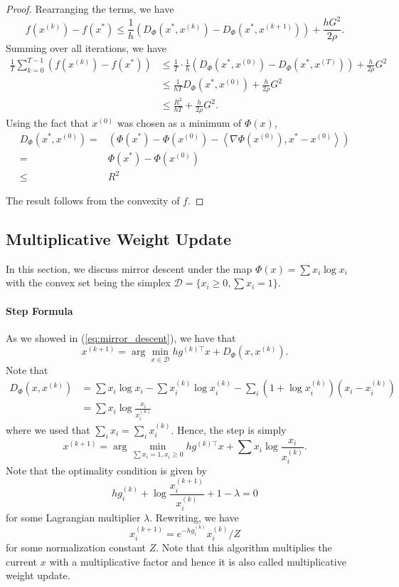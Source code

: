 \begin{proof}
Rearranging the terms, we have
\[
f(x^{(k)})-f(x^{*})\leq\frac{1}{h}\left(D_{\Phi}(x^{*},x^{(k)})-D_{\Phi}(x^{*},x^{(k+1)})\right)+\frac{hG^{2}}{2\rho}.
\]
Summing over all iterations, we have
\begin{align*}
\frac{1}{T}\sum_{k=0}^{T-1}(f(x^{(k)})-f(x^{*})) & \leq\frac{1}{T}\cdot\frac{1}{h}(D_{\Phi}(x^{*},x^{(0)})-D_{\Phi}(x^{*},x^{(T)}))+\frac{h}{2\rho}G^{2}\\
 & \leq\frac{1}{hT}D_{\Phi}(x^{*},x^{(0)})+\frac{h}{2\rho}G^{2}\\
 & \leq\frac{R^{2}}{hT}+\frac{h}{2\rho}G^{2}.
\end{align*}
Using the fact that $x^{(0)}$ was chosen as a minimum of $\Phi(x)$,
\begin{align*}
D_{\Phi}(x^{*},x^{(0)})= & (\Phi(x^{*})-\Phi(x^{(0)})-\left\langle \nabla\Phi(x^{(0)}),x^{*}-x^{(0)}\right\rangle )\\
= & \Phi(x^{*})-\Phi(x^{(0)})\\
\le & R^{2}
\end{align*}

The result follows from the convexity of $f$.
\end{proof}

\subsection{Multiplicative Weight Update}

In this section, we discuss mirror descent under the map $\Phi(x)=\sum x_{i}\log x_{i}$
with the convex set being the simplex $\mathcal{D}=\{x_{i}\geq0,\sum x_{i}=1\}$.

\paragraph{Step Formula}

As we showed in (\ref{eq:mirror_descent}), we have that
\[
x^{(k+1)}=\arg\min_{x\in\mathcal{D}}hg^{(k)\top}x+D_{\Phi}(x,x^{(k)}).
\]
Note that
\begin{align*}
D_{\Phi}(x,x^{(k)}) & =\sum x_{i}\log x_{i}-\sum x_{i}^{(k)}\log x_{i}^{(k)}-\sum_{i}(1+\log x_{i}^{(k)})(x_{i}-x_{i}^{(k)})\\
 & =\sum x_{i}\log\frac{x_{i}}{x_{i}^{(k)}}
\end{align*}
where we used that $\sum_{i}x_{i}=\sum_{i}x_{i}^{(k)}$. Hence, the
step is simply 
\[
x^{(k+1)}=\arg\min_{\sum x_{i}=1,x_{i}\geq0}hg^{(k)\top}x+\sum x_{i}\log\frac{x_{i}}{x_{i}^{(k)}}.
\]
Note that the optimality condition is given by
\[
hg_{i}^{(k)}+\log\frac{x_{i}^{(k+1)}}{x_{i}^{(k)}}+1-\lambda=0
\]
for some Lagrangian multiplier $\lambda$. Rewriting, we have
\[
x_{i}^{(k+1)}=e^{-hg_{i}^{(k)}}x_{i}^{(k)}/Z
\]
for some normalization constant $Z$. Note that this algorithm multiplies
the current $x$ with a multiplicative factor and hence it is also
called multiplicative weight update.

